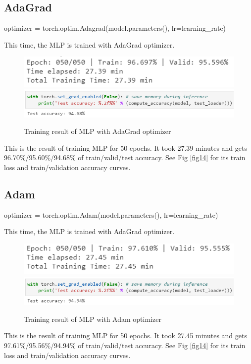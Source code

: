 \documentclass[11pt]{article}
\begin{document}
\subsection{AdaGrad}
\begin{pythoncode*}{}
optimizer = torch.optim.Adagrad(model.parameters(), lr=learning_rate)
\end{pythoncode*}
    This time, the MLP is trained with AdaGrad optimizer.
    \begin{figure}[H]
        \includegraphics[width=0.8\linewidth]{img/AdaGrad/final.PNG}
        \includegraphics[width=1\linewidth]{img/AdaGrad/test.PNG}
        \caption{Training result of MLP with AdaGrad optimizer}
        \label{fig12}
    \end{figure}
    This is the result of training MLP for 50 epochs. It took 27.39 minutes and gets 96.70\%/95.60\%/94.68\% of train/valid/test accuracy. See Fig \ref{fig14} for its train loss and train/validation accuracy curves.
    
\subsection{Adam}
\begin{pythoncode*}{}
optimizer = torch.optim.Adam(model.parameters(), lr=learning_rate)
\end{pythoncode*}
    This time, the MLP is trained with AdaGrad optimizer.
    \begin{figure}[H]
        \includegraphics[width=0.8\linewidth]{img/Adam/final.PNG}
        \includegraphics[width=1\linewidth]{img/Adam/test.PNG}
        \caption{Training result of MLP with Adam optimizer}
        \label{fig13}
    \end{figure}
    This is the result of training MLP for 50 epochs. It took 27.45 minutes and gets 97.61\%/95.56\%/94.94\% of train/valid/test accuracy. See Fig \ref{fig14} for its train loss and train/validation accuracy curves.
\end{document}
